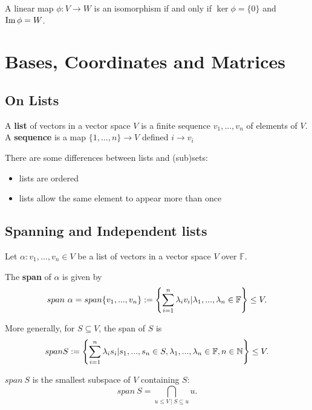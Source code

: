 \begin{corollary}
  A linear map $\phi : V \rightarrow W$ is an isomorphism if and only if $\ker \phi = \{0\}$ and $\operatorname{Im} \phi = W$.
\end{corollary}

\section{Bases, Coordinates and Matrices}

\subsection{On Lists}
\begin{definition}
  A {\bf list} of vectors in a vector space $V$ is a finite sequence $v_1,...,v_n$ of elements of $V$.
  A {\bf sequence} is a map $\{1,...,n\} \rightarrow V$ defined $i \rightarrow v_i$
\end{definition}

There are some differences between lists and (sub)sets:
\begin{itemize}
  \item lists are ordered
  \item lists allow the same element to appear more than once
\end{itemize}

\subsection{Spanning and Independent lists}

\begin{definition}
    Let $\alpha : v_1,...,v_n \in V$ be a list of vectors in a vector space $V$ over $\mathbb{F}$.

  The {\bf span} of $\alpha$ is given by
  \[span \ \alpha = span \{v_1,...,v_n\} := \left\{ \sum_{i=1}^n \lambda_i v_i \\ | \\ \lambda_1,...,\lambda_n \in \mathbb{F}\right\} \leq V.\]

  More generally, for $S \subseteq V$, the span of $S$ is
  \[span S := \left\{ \sum_{i=1}^n \lambda_i s_i \\ | \\ s_1,...,s_n \in S, \lambda_1,...,\lambda_n \in \mathbb{F}, n \in \mathbb{N} \right\} \leq V.\]
\end{definition}

$span \ S$ is the smallest subspace of $V$ containing $S:$
\[span \ S = \bigcap_{u\leq V \ | \ S \subseteq u} u.\]

